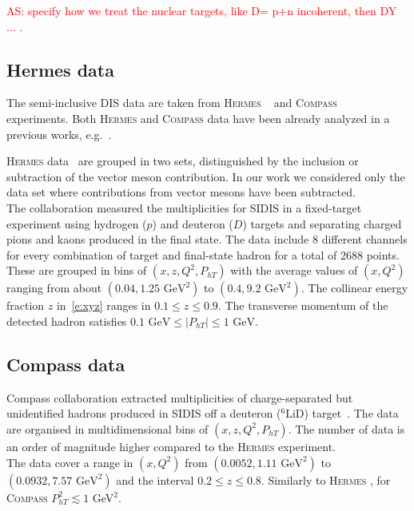 \documentclass[aps,preprintnumbers,showpacs,nofootinbib,superscriptaddress,floatfix]{revtex4}
\newcommand{\hermes}{\textsc{Hermes }}
\newcommand{\compass}{\textsc{Compass }}
\newcommand{\Tperp}{T}
\begin{document}
\textcolor{red}{AS: specify how we treat the nuclear targets, like D= p+n incoherent, then DY ... .}

\subsection{Hermes data}
\label{ss:hermes}

The semi-inclusive DIS data are taken from \hermes~\cite{Airapetian:2012ki} and \compass~\cite{Adolph:2013stb} experiments. 
Both \hermes and \compass data have been already analyzed in a previous works, e.g.~\cite{Signori:2013mda,Anselmino:2013lza}.

\hermes data~\cite{Airapetian:2012ki} are grouped in two sets, distinguished by the inclusion or subtraction of the vector meson contribution. In our work we considered only the data set where contributions from vector mesons have been subtracted. \\
The collaboration measured the multiplicities for SIDIS in a fixed-target experiment using hydrogen ($p$) and deuteron ($D$) targets and separating charged pions and kaons produced in the final state. The data include 8 different channels for every combination of target and final-state hadron for a total of 2688 points.\\
These are grouped in bins of $(x,z,Q^2,P_{hT})$ with the average values of $(x,Q^2)$ ranging from about $(0.04, 1.25\text{ GeV}^2)$ to $(0.4, 9.2\text{ GeV}^2)$. 
The collinear energy fraction $z$ in~\eqref{e:xyz} ranges in $0.1\leq z\leq 0.9$. The transverse momentum of the detected hadron satisfies $0.1 \text{ GeV} \leq \vert P_{hT} \vert \leq 1 \text{ GeV}$.

\subsection{Compass data}
\label{ss:compass}

Compass collaboration extracted multiplicities of charge-separated but unidentified hadrons produced in SIDIS off a deuteron ($^6\text{LiD}$) target~\cite{Adolph:2013stb}. 
The data are organised in multidimensional bins of $(x,z,Q^2,P_{h\Tperp})$. The number of data is an order of magnitude higher compared to the \hermes experiment. \\
The data cover a range in $(x,Q^2)$ from $(0.0052, 1.11\text{ GeV}^2)$ to $(0.0932, 7.57\text{ GeV}^2)$ and the interval $0.2 \leq z \leq 0.8$. Similarly to \hermes, for \compass $P_{h\Tperp}^2 \lesssim 1$ GeV$^2$. 
\end{document}
